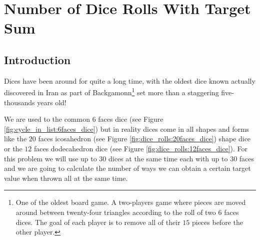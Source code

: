 %

\chapter{Number of Dice Rolls With Target Sum}
\label{ch:dice_rolls}
\section*{Introduction}
Dices have been around for quite a long time, with the oldest dice known actually discovered in Iran
as part of Backgamonn\footnote{One of the oldest board game. A two-players game where pieces are
moved around between twenty-four triangles according to the roll of two $6$ faces dices. The goal of
each player is to remove all of their $15$ pieces before the other player.} set more than a
staggering five-thousands years old! 

We are used to the common $6$ faces dice (see Figure \ref{fig:cycle_in_list:6faces_dice}) but in
reality dices come in all shapes and forms like the $20$ faces icosahedron (see Figure
\ref{fig:dice_rolls:20faces_dice}) shape dice or the $12$ faces dodecahedron dice (see Figure
\ref{fig:dice_rolls:12faces_dice}). For this problem we will use up to $30$ dices at the same time
each with up to $30$ faces and we are going to calculate the number of ways we can obtain a certain
target value when thrown all at the same time.


